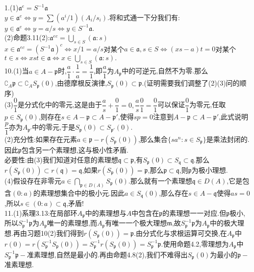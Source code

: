 \documentclass[b5paper]{ctexart}
\begin{document}
\pagestyle{plain}
\noindent
{}
1.(1)$\mathfrak{a}^e=S^{-1}\mathfrak{a}$\\
$y\in \mathfrak{a}^e$$\Leftrightarrow y=\sum (a^i/1)(A_i/s_i)$.将和式通一下分我们有:$y\in\mathfrak{a}^e \Leftrightarrow y=a/s\Leftrightarrow y\in S^{-1}\mathfrak{a}$.\\
(2)命题3.11(2):$\mathfrak{a}^{ec}=\bigcup\limits_{s\in S}(\mathfrak{a}:s)$\\
$x\in \mathfrak{a}^{ec}=(S^{-1}\mathfrak{a})^c\Leftrightarrow x/1=a/s$对某个$a\in\mathfrak{a},s\in S\Leftrightarrow$$(xs-a)t=0$对某个$t\in s\Leftrightarrow $$xst\in\mathfrak{a}\Leftrightarrow x\in\bigcup\limits_{s\in S}(\mathfrak{a}:s).$\\
10.(1)当$a\in A-\mathfrak{p}$时,$\dfrac{a}{1}\cdot\dfrac{1}{a}=\dfrac{1}{1}$,即$\dfrac{a}{1}$为$A_{\mathfrak{p}}$中的可逆元,自然不为零.那么$\complement_A\mathfrak{p}\subset \complement_A S_{\mathfrak{p}}(0)$,由德摩根反演律,$S_{\mathfrak{p}}(0)\subset \mathfrak{p}$.(证明需要我们调整了(2)(3)问的顺序)\\
(3)$\dfrac{0}{1}$是分式化中的零元,这是由于$\dfrac{a}{s}+\dfrac{0}{1}=0,\dfrac{a}{s}\dfrac{0}{1}=\dfrac{0}{1}$可以保证$\dfrac{0}{1}$为零元,任取$p\in S_{\mathfrak{p}}(0)$,则存在$s\in A-\mathfrak{p}$$\subset A-\mathfrak{p}'$,使得$sp=0$注意到$A-\mathfrak{p}\subset A-\mathfrak{p}'$,此式说明$\dfrac{p}{1}$亦为$A_{\mathfrak{p}'}$中的零元,于是$S_{\mathfrak{p}}(0)\subset S_{\mathfrak{p}'}(0)$.\\
(2)充分性:如果存在元素$a\in \mathfrak{p}-r(S_{\mathfrak{p}}(0))$,那么集合$\{sa^n:s\in S_{\mathfrak{p}}\}$是乘法封闭的.因此$\mathfrak{p}$包含另一个素理想,这与极小性矛盾.\\
必要性:由(3)我们知道对任意的素理想$\mathfrak{q}\subset \mathfrak{p}$,有$S_{\mathfrak{p}}(0)\subset S_{\mathfrak{q}}\subset \mathfrak{q}$.那么$r(S_{\mathfrak{p}}(0))\subset r(\mathfrak{q})=\mathfrak{q}$,如果$r(S_{\mathfrak{p}}(0))=\mathfrak{p}$,那么$\mathfrak{p}\subset\mathfrak{q}$,则$\mathfrak{p}$为极小理想.\\
(4)假设存在非零元$a\in\bigcap\limits_{\mathfrak{p}\in D(A)}S_{\mathfrak{p}}(0)$.那么就有一个素理想$\mathfrak{q}\in D(A)$,它是包含$(0:a)$的素理想集合中的极小元.因此$a\in S_{\mathfrak{q}}(0)$,那么存在$s\in A-\mathfrak{q}$使得$as=0$,所以$s\in (0:a)\subset \mathfrak{q}$,矛盾!\\
11.(1)系理3.13:在局部环$A_{\mathfrak{p}}$中的素理想与$A$中包含在$\mathfrak{p}$的素理想一一对应.但$\mathfrak{p}$极小,所以$S^{-1}_{\mathfrak{p}}{\mathfrak{p}}$为$A_{\mathfrak{p}}$唯一的素理想,而$A_{\mathfrak{p}}$有唯一一个极大理想$\mathfrak{m}$,故$S^{-1}_{\mathfrak{p}}{\mathfrak{p}}$为$A_{\mathfrak{p}}$中的极大理想.再由习题10(2)我们得到$r(S_{\mathfrak{p}}(0))=\mathfrak{p}$.由分式化与求根运算可交换,在$A_{\mathfrak{p}}$中$r(0)=r(S^{-1}_{\mathfrak{p}}S_{\mathfrak{p}}(0))=S^{-1}_{\mathfrak{p}}r(S_{\mathfrak{p}}(0))=S^{-1}_{\mathfrak{p}}\mathfrak{p}$.使用命题4.2,零理想为$A_{\mathfrak{p}}$中$S^{-1}_{\mathfrak{p}}\mathfrak{p}-$准素理想,自然是最小的.再由命题4.8(2),我们不难得出$S_{\mathfrak{p}}(0)$为最小的$\mathfrak{p}-$准素理想.\\
\end{document}
